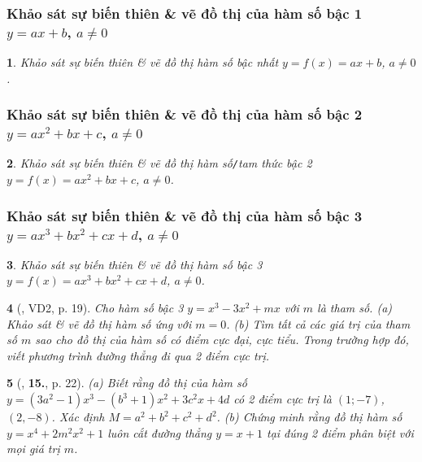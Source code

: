 \documentclass{article}
\newtheorem{baitoan}{}
\begin{document}
\subsubsection{Khảo sát sự biến thiên \& vẽ đồ thị của hàm số bậc 1 $y = ax + b$, $a\ne 0$}

\begin{baitoan}
	Khảo sát sự biến thiên \& vẽ đồ thị hàm số bậc nhất $y = f(x) = ax + b$, $a\ne 0$.
\end{baitoan}

\subsubsection{Khảo sát sự biến thiên \& vẽ đồ thị của hàm số bậc 2 $y = ax^2 + bx + c$, $a\ne 0$}

\begin{baitoan}
	Khảo sát sự biến thiên \& vẽ đồ thị hàm số\emph{\texttt{/}}tam thức bậc 2 $y = f(x) = ax^2 + bx + c$, $a\ne 0$.
\end{baitoan}

\subsubsection{Khảo sát sự biến thiên \& vẽ đồ thị của hàm số bậc 3 $y = ax^3 + bx^2 + cx + d$, $a\ne 0$}

\begin{baitoan}
	Khảo sát sự biến thiên \& vẽ đồ thị hàm số bậc 3 $y = f(x) = ax^3 + bx^2 + cx + d$, $a\ne 0$.
\end{baitoan}

\begin{baitoan}[\cite{TLCT_giai_tich_12}, VD2, p. 19]
	Cho hàm số bậc 3 $y = x^3 - 3x^2 + mx$ với $m$ là tham số. (a) Khảo sát \& vẽ đồ thị hàm số ứng với $m = 0$. (b) Tìm tất cả các giá trị của tham số $m$ sao cho đồ thị của hàm số có điểm cực đại, cực tiểu. Trong trường hợp đó, viết phương trình đường thẳng đi qua 2 điểm cực trị.
\end{baitoan}

\begin{baitoan}[\cite{TLCT_giai_tich_12}, \textbf{15.}, p. 22]
	(a) Biết rằng đồ thị của hàm số $y = (3a^2 - 1)x^3 - (b^3 + 1)x^2 + 3c^2x + 4d$ có 2 điểm cực trị là $(1;-7)$, $(2,-8)$. Xác định $M = a^2 + b^2 + c^2 + d^2$. (b) Chứng minh rằng đồ thị hàm số $y = x^4 + 2m^2x^2 + 1$ luôn cắt đường thẳng $y = x + 1$ tại đúng 2 điểm phân biệt với mọi giá trị $m$.
\end{baitoan}
\end{document}
